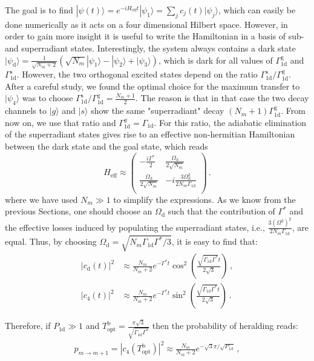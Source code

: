 \documentclass[twocolumn,pra,aps,superscriptaddress,showpacs]{revtex4-1}
\newcommand{\ket}[1]{|#1\rangle}
\def\oned{\mathrm{1d}}
\newcommand{\rs}{\mathrm{s}}
\newcommand{\rd}{\mathrm{d}}
\newcommand{\rg}{\mathrm{g}}
\newcommand{\bb}{\mathrm{b}}
\begin{document}
The goal is to find 
$\ket{\psi(t)}=e^{-i H_\mathrm{eff} t}\ket{\psi_1}=\sum_{j} c_j(t)\ket{\psi_j}$,
which can easily be done numerically as it acts on a four dimensional Hilbert space. However, in order to gain more insight it is useful to write the Hamiltonian in a basis of sub- and superradiant states. Interestingly, the system always contains a dark state 
$\ket{\psi_\rd}=\frac{1}{\sqrt{N_m+2}} \left( \sqrt{N_m} \ket{\psi_1}-\ket{\psi_2}+\ket{\psi_3}\right)$,
which is dark for all values of $\Gamma_\oned^\rg$ and $\Gamma_\oned^\rs$. However, the two orthogonal excited states depend on the ratio $\Gamma_\oned^\rs / \Gamma_\oned^\rg$. After a careful study, we found the optimal choice for the maximum transfer to $\ket{\psi_4}$ was to choose  $\Gamma_\oned^\rs / \Gamma_\oned^\rg = \frac{N_m+1}{2}$. The reason is that in that case the two decay channels to $\ket{g}$ and $\ket{s}$ show the same "superradiant" decay $(N_m+1)\Gamma_\oned^\rg$.  From now on, we use that ratio and $\Gamma_{\oned}
^g=\Gamma_{\oned}$. For this ratio, the adiabatic elimination of the superradiant states gives rise to an effective non-hermitian Hamiltonian between the dark state and the goal state, which reads
%
\begin{equation}\label{eqSM:eff1step}
H_{\mathrm{eff}} 
	\approx \left(
	\begin{array}{cc}
 		-\frac{i \Gamma^*}{2} &  \frac{\Omega_\rd}{2\sqrt{N_m}} \\
   		\frac{\Omega_\rd}{2\sqrt{N_m}} & -i\frac{3 \Omega_\rd^2 }{2N_m\Gamma_\oned}\\
	\end{array}\right)\,.
\end{equation}
%
where we have used $N_m\gg 1$ to simplify the expressions. As we know from the previous Sections, one should choose an $\Omega_\rd$ such that the contribution of $\Gamma^*$ and the effective losses induced by populating the superradiant states, i.e., $\frac{3(\Omega^\rd)^2 }{2N_m\Gamma_\oned}$, are equal. Thus, by choosing $\Omega_\rd = \sqrt{N_m \Gamma_\oned \Gamma^* / 3}$, it is easy to find that:
%
\begin{align}\label{eqSM:a}
|c_\rd(t)|^2 
	&\approx \frac{N_m}{N_m+2} e^{-\Gamma^*t} \cos^2(\frac{\sqrt{\Gamma_\oned\Gamma^*}t}{2\sqrt{3}})\,, \nonumber \\
|c_4(t)|^2
	&\approx \frac{N_m}{N_m+2} e^{-\Gamma^*t} \sin^2(\frac{\sqrt{\Gamma_\oned\Gamma^*}t}{2\sqrt{3}})\,.
\end{align}
%

Therefore, if $P_\oned\gg1$ and 
$T_\mathrm{opt}^\bb =\frac{\pi\sqrt{3}}{\sqrt{\Gamma_{\oned}\Gamma^*}}$ 
then the probability of heralding reads:
%
\begin{align} \label{eqSM:pbig}
p_{m \rightarrow m+1}
	= |c_4(T_\mathrm{opt}^\bb)|^2
	\approx \frac{N_m}{N_m+2} e^{-\sqrt{3}\pi/\sqrt{P_\oned}}\,,
\end{align}
%
 
\end{document}
